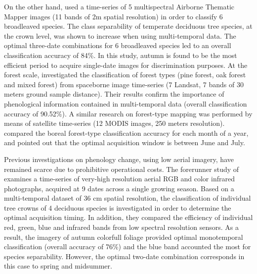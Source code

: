 \documentclass[remotesensing,article,submit,moreauthors,pdftex,12pt,a4paper]{mdpi} %
\begin{document}
On the other hand, \citeauthor{hill_mapping_2010} \cite{hill_mapping_2010} used a time-series of 5 multispectral Airborne Thematic Mapper images (11 bands of 2m spatial resolution) in order to classify 6 broadleaved species. 
The class separability of temperate deciduous tree species, at the crown level, was shown to increase when using multi-temporal data. 
The optimal three-date combinations for 6 broadleaved species led to an overall classification accuracy of 84\%. 
In this study, autumn is found to be the most efficient period to acquire single-date images for discrimination purposes. 
At the forest scale, \citeauthor{zhu_accurate_2014} \cite{zhu_accurate_2014} investigated the classification of forest types (pine forest, oak forest and mixed forest) from spaceborne image time-series (7 Landsat, 7 bands of 30 meters ground sample distance). 
Their results confirm the importance of phenological information contained in multi-temporal data (overall classification accuracy of 90.52\%). 
A similar research on forest-type mapping was performed by means of satellite time-series (12 MODIS images, 250 meters resolution). 
\citeauthor{kempeneers_data_2011} \cite{kempeneers_data_2011} compared the boreal forest-type classification accuracy for each month of a year, and pointed out that the optimal acquisition window is between June and July.


Previous investigations on phenology change, using low aerial imagery, have remained scarce due to prohibitive operational costs. 
The forerunner study of \citeauthor{key_comparison_2001} \cite{key_comparison_2001} examines a time-series of very-high resolution aerial RGB and color infrared photographs, acquired at 9 dates across a single growing season. 
Based on a multi-temporal dataset of 36 cm spatial resolution, the classification of individual tree crowns of 4 deciduous species is investigated in order to determine the optimal acquisition timing. 
In addition, they compared the efficiency of individual red, green, blue and infrared bands from low spectral resolution sensors. 
As a result, the imagery of autumn colorfull foliage provided optimal monotemporal classification (overall accuracy of 76\%) and the blue band accounted the most for species separability. 
However, the optimal two-date combination corresponds in this case to spring and midsummer. 
\end{document}
